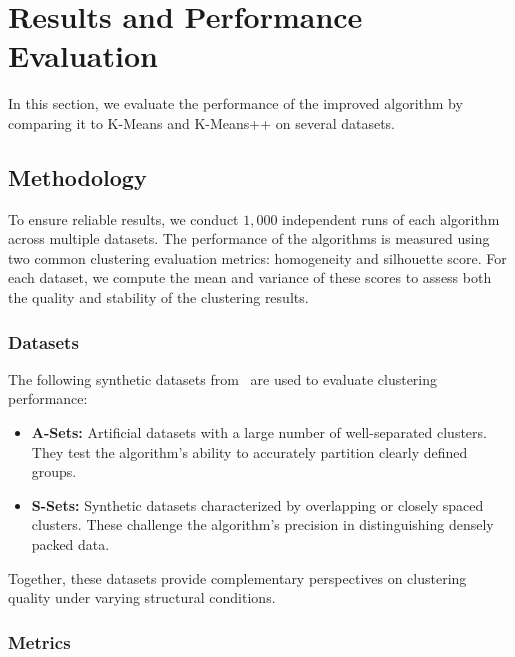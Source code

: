 \documentclass[10pt,twocolumn,letterpaper]{article}
\begin{document}


\section{Results and Performance Evaluation}\label{sec:results-and-performance-evaluation}

In this section, we evaluate the performance of the improved algorithm by
comparing it to K-Means and K-Means++ on several datasets.


\subsection{Methodology}\label{subsec:methodology}

To ensure reliable results, we conduct $1,000$ independent runs of each
algorithm across multiple datasets. The performance of the algorithms is
measured using two common clustering evaluation metrics: homogeneity and
silhouette score. For each dataset, we compute the mean and variance of these
scores to assess both the quality and stability of the clustering results.

\subsubsection{Datasets}

The following synthetic datasets from~\cite{ClusteringDatasets} are used to
evaluate clustering performance:

\begin{itemize}
    \item \textbf{A-Sets:} Artificial datasets with a large number of well-separated clusters. They test the algorithm’s ability to accurately partition clearly defined groups.
    \item \textbf{S-Sets:} Synthetic datasets characterized by overlapping or closely spaced clusters. These challenge the algorithm’s precision in distinguishing densely packed data.
\end{itemize}
Together, these datasets provide complementary perspectives on clustering
quality under varying structural conditions.

\subsubsection{Metrics}
\end{document}
